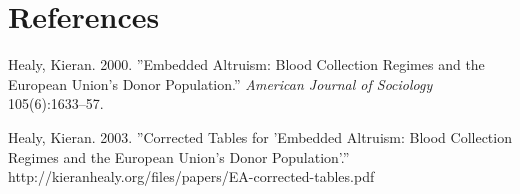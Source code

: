 \documentclass[11pt,article,oneside]{memoir}
\begin{document}
\clearpage

\section{References}\label{references}

\setlength{\parindent}{-0.2in} \setlength{\leftskip}{0.2in}
\setlength{\parskip}{8pt} \vspace*{-0.2in} \noindent

Healy, Kieran. 2000. ''Embedded Altruism: Blood Collection Regimes and
the European Union's Donor Population.'' \emph{American Journal of
Sociology} 105(6):1633--57.

Healy, Kieran. 2003. ''Corrected Tables for 'Embedded Altruism: Blood
Collection Regimes and the European Union's Donor Population'.'' http://kieranhealy.org/files/papers/EA-corrected-tables.pdf
\end{document}
